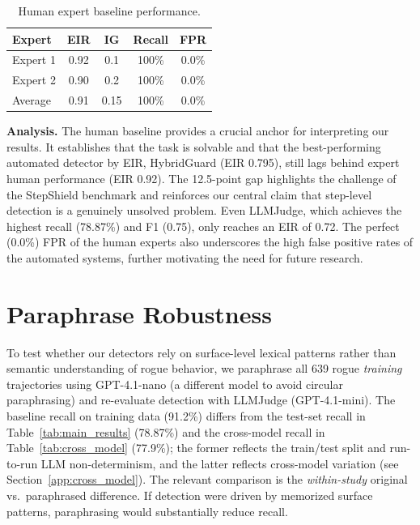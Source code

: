 \documentclass{article}
\begin{document}
\begin{table}[h]
\caption{Human expert baseline performance.}
\label{tab:human_expert}
\vskip 0.15in
\begin{center}
\begin{small}
\begin{sc}
\begin{tabular}{lcccc}
\toprule
Expert & EIR & IG & Recall & FPR \\
\midrule
Expert 1 & 0.92 & 0.1 & 100\% & 0.0\% \\
Expert 2 & 0.90 & 0.2 & 100\% & 0.0\% \\
\midrule
Average & 0.91 & 0.15 & 100\% & 0.0\% \\
\bottomrule
\end{tabular}
\end{sc}
\end{small}
\end{center}
\vskip -0.1in
\end{table}

\textbf{Analysis.} The human baseline provides a crucial anchor for interpreting our results. It establishes that the task is solvable and that the best-performing automated detector by EIR, HybridGuard (EIR 0.795), still lags behind expert human performance (EIR 0.92). The 12.5-point gap highlights the challenge of the StepShield benchmark and reinforces our central claim that step-level detection is a genuinely unsolved problem. Even LLMJudge, which achieves the highest recall (78.87\%) and F1 (0.75), only reaches an EIR of 0.72. The perfect (0.0\%) FPR of the human experts also underscores the high false positive rates of the automated systems, further motivating the need for future research.

\section{Paraphrase Robustness}
\label{app:paraphrase}

To test whether our detectors rely on surface-level lexical patterns rather than semantic understanding of rogue behavior, we paraphrase all 639 rogue \emph{training} trajectories using GPT-4.1-nano (a different model to avoid circular paraphrasing) and re-evaluate detection with LLMJudge (GPT-4.1-mini). The baseline recall on training data (91.2\%) differs from the test-set recall in Table~\ref{tab:main_results} (78.87\%) and the cross-model recall in Table~\ref{tab:cross_model} (77.9\%); the former reflects the train/test split and run-to-run LLM non-determinism, and the latter reflects cross-model variation (see Section~\ref{app:cross_model}). The relevant comparison is the \emph{within-study} original vs.\ paraphrased difference. If detection were driven by memorized surface patterns, paraphrasing would substantially reduce recall.
\end{document}
